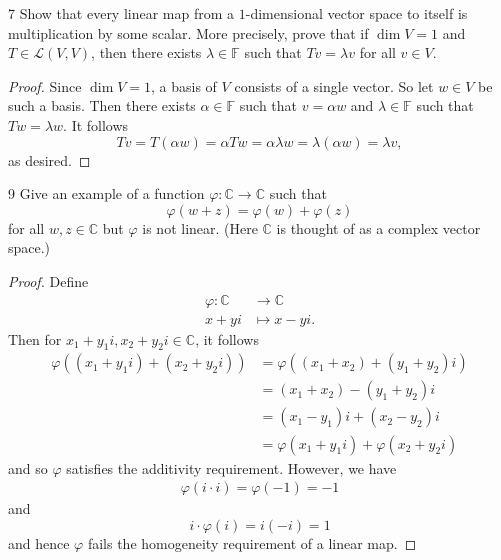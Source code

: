 \documentclass{extarticle}
\newenvironment{problem}[1]{\begin{prob*}{#1}{}}{\end{prob*}}
\newcommand{\C}{\mathbb{C}}
\newcommand{\F}{\mathbb{F}}
\newcommand{\Hom}{\mathcal{L}}
\begin{document}
\begin{problem}{7}
Show that every linear map from a $1$-dimensional vector space to itself is multiplication by some scalar.  More precisely, prove that if $\dim V= 1$ and $T\in\Hom(V,V)$, then there exists $\lambda\in\F$ such that $Tv = \lambda v$ for all $v\in V$.
\end{problem}
\begin{proof}
Since $\dim V = 1$, a basis of $V$ consists of a single vector.  So let $w\in V$ be such a basis.  Then there exists $\alpha\in\F$ such that $v = \alpha w$ and $\lambda\in \F$ such that $Tw = \lambda w$.  It follows
\begin{equation*}
Tv = T(\alpha w) = \alpha Tw = \alpha\lambda w = \lambda(\alpha w) = \lambda v,
\end{equation*}
as desired.
\end{proof}

\begin{problem}{9}
Give an example of a function $\varphi:\C\to\C$ such that 
\begin{equation*}
\varphi(w + z) = \varphi(w) + \varphi(z)
\end{equation*}
for all $w,z\in\C$ but $\varphi$ is not linear.  (Here $\C$ is thought of as a complex vector space.)
\end{problem}
\begin{proof}
Define 
\begin{align*}
\varphi:\C&\to\C\\
       x + yi &\mapsto x - yi.
\end{align*}
Then for $x_1 + y_1i, x_2 + y_2i\in\C$, it follows
\begin{align*}
\varphi((x_1 + y_1i) + (x_2 + y_2i)) &= \varphi((x_1 + x_2) + (y_1 + y_2)i)\\
&= (x_1 + x_2) - (y_1 + y_2)i\\
&= (x_1 - y_1)i + (x_2 - y_2)i\\
&= \varphi(x_1 + y_1i) + \varphi(x_2 + y_2i)
\end{align*}
and so $\varphi$ satisfies the additivity requirement.  However, we have
\begin{align*}
\varphi(i\cdot i) = \varphi(-1) = -1
\end{align*}
and 
\begin{equation*}
i\cdot\varphi(i) = i(-i) = 1
\end{equation*}
and hence $\varphi$ fails the homogeneity requirement of a linear map.
\end{proof}
\end{document}
